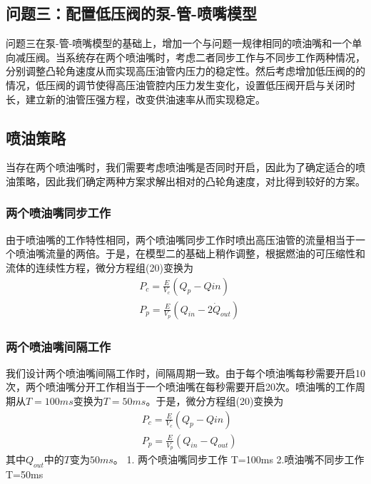 \documentclass[withoutpreface,bwprint]{cumcmthesis} %
\begin{document}
			\subsection{问题三：配置低压阀的泵­-管-­喷嘴模型}
			问题三在泵-管-喷嘴模型的基础上，增加一个与问题一规律相同的喷油嘴和一个单向减压阀。当系统存在两个喷油嘴时，考虑二者同步工作与不同步工作两种情况，分别调整凸轮角速度从而实现高压油管内压力的稳定性。然后考虑增加低压阀的的情况，低压阀的调节使得高压油管腔内压力发生变化，设置低压阀开启与关闭时长，建立新的油管压强方程，改变供油速率从而实现稳定。
			
			\subsection{喷油策略}
			当存在两个喷油嘴时，我们需要考虑喷油嘴是否同时开启，因此为了确定适合的喷油策略，因此我们确定两种方案求解出相对的凸轮角速度，对比得到较好的方案。
			
			\subsubsection{两个喷油嘴同步工作}
			由于喷油嘴的工作特性相同，两个喷油嘴同步工作时喷出高压油管的流量相当于一个喷油嘴流量的两倍。于是，在模型二的基础上稍作调整，根据燃油的可压缩性和流体的连续性方程，微分方程组(20)变换为
			\begin{equation}
			\begin{aligned}
			&P_c=\frac{E}{V_c}(Q_p-Q{in}) \\
			&P_p=\frac{E}{V_p}(Q_{in}-2\dot Q_{out})
			\end{aligned}
			\end{equation}
			
			\subsubsection{两个喷油嘴间隔工作}
			我们设计两个喷油嘴间隔工作时，间隔周期一致。由于每个喷油嘴每秒需要开启10次，两个喷油嘴分开工作相当于一个喷油嘴在每秒需要开启20次。喷油嘴的工作周期从$T = 100ms$变换为$T = 50ms$。于是，微分方程组(20)变换为
			\begin{equation}
			\begin{aligned}
			&P_c=\frac{E}{V_c}(Q_p-Q{in}) \\
			&P_p=\frac{E}{V_p}(Q_{in}-Q_{out})
			\end{aligned}
			\end{equation}
			其中$Q_{out}$中的$T$变为$50ms$。
			1. 两个喷油嘴同步工作
			T=100ms
			2.喷油嘴不同步工作
			T=50ms
			
\end{document}
